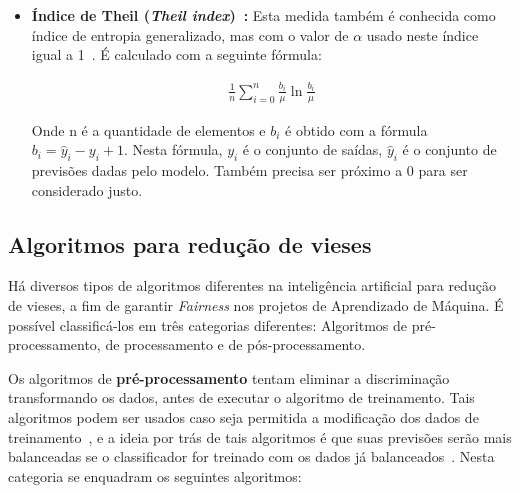 \documentclass[portugues]{ic-tese}
\begin{document}
\begin{itemize}
\item \textbf{Índice de Theil (\textit{Theil index})~\citep{Speicher_2018}:} Esta medida também é conhecida como índice de entropia generalizado, mas com o valor de $\alpha$ usado neste índice igual a 1~\citep{Speicher_2018}. É calculado com a seguinte fórmula:

\begin{align*}
\frac{1}{n}\sum^{n}_{i=0}\frac{b_i}{\mu}\ln{\frac{b_i}{\mu}}
\end{align*}

Onde n é a quantidade de elementos e $b_i$ é obtido com a fórmula $b_i = \hat{y}_i - y_i + 1$. Nesta fórmula, $y_i$ é o conjunto de saídas, $\hat{y}_i$ é o conjunto de previsões dadas pelo modelo. Também precisa ser próximo a 0 para ser considerado justo.

\end{itemize}

\subsection{Algoritmos para redução de vieses}
\label{sec:unbiasedAlgorithms}

Há diversos tipos de algoritmos diferentes na inteligência artificial para redução de vieses, a fim de garantir \textit{Fairness} nos projetos de Aprendizado de Máquina. É possível classificá-los em três categorias diferentes: Algoritmos de pré-processamento, de processamento e de pós-processamento.

Os algoritmos de \textbf{pré-processamento} tentam eliminar a discriminação transformando os dados, antes de executar o algoritmo de treinamento. Tais algoritmos podem ser usados caso seja permitida a modificação dos dados de treinamento~\citep{dAlessandro_2017}, e a ideia por trás de tais algoritmos é que suas previsões serão mais balanceadas se o classificador for treinado com os dados já balanceados~\citep{Kamiran_2009}. Nesta categoria se enquadram os seguintes algoritmos:
\end{document}
